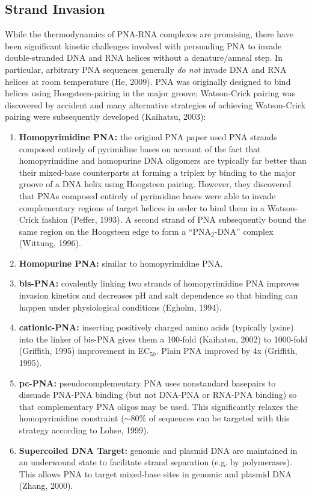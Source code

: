 \documentclass[a4paper,12pt]{article}
\begin{document}
\subsection{Strand Invasion}
While the thermodynamics of PNA-RNA complexes are promising, there have been significant kinetic challenges involved with persuading PNA to invade double-stranded DNA and RNA helices without a denature/anneal step. In particular, arbitrary PNA sequences generally {\it do not} invade DNA and RNA helices at room temperature (He, 2009). PNA was originally designed to bind helices using Hoogsteen-pairing in the major groove; Watson-Crick pairing was discovered by accident  and many alternative strategies of achieving Watson-Crick pairing were subsequently developed (Kaihatsu, 2003):
\begin{enumerate}
\item {\bf Homopyrimidine PNA:} the original PNA paper used PNA strands composed entirely of pyrimidine bases on account of the fact that homopyrimidine and homopurine DNA oligomers are typically far better than their mixed-base counterparts at forming a triplex by binding to the major groove of a DNA helix using Hoogsteen pairing. However, they discovered that PNAs composed entirely of pyrimidine bases were able to invade complementary regions of target helices in order to bind them in a Watson-Crick fashion (Peffer, 1993). A second strand of PNA subsequently bound the same region on the Hoogsteen edge to form a ``PNA$_2$-DNA'' complex (Wittung, 1996).
\item {\bf Homopurine PNA:} similar to homopyrimidine PNA.
\item {\bf bis-PNA:} covalently linking two strands of homopyrimidine PNA improves invasion kinetics and decreases pH and salt dependence so that binding can happen under physiological conditions (Egholm, 1994).
\item {\bf cationic-PNA:} inserting positively charged amino acids (typically lysine) into the linker of bis-PNA gives them a 100-fold (Kaihatsu, 2002) to 1000-fold (Griffith, 1995) improvement in EC$_{50}$. Plain PNA improved by 4x (Griffith, 1995).
\item {\bf pc-PNA:} pseudocomplementary PNA uses nonstandard basepairs to dissuade PNA-PNA binding (but not DNA-PNA or RNA-PNA binding) so that complementary PNA oligos may be used. This significantly relaxes the homopyrimidine constraint ($\sim$80\% of sequences can be targeted with this strategy according to Lohse, 1999).
\item {\bf Supercoiled DNA Target:} genomic and plasmid DNA are maintained in an underwound state to facilitate strand separation (e.g. by polymerases). This allows PNA to target mixed-base sites in genomic and plasmid DNA (Zhang, 2000).

\end{enumerate}
\end{document}
